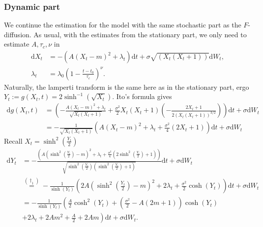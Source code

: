 \subsubsection{Dynamic part}
We continue the estimation for the model with the same stochastic part as the $F$-diffusion. As usual, with the estimates from the stationary part, we only need to estimate $A, \tau_c, \nu$ in
\begin{align}
    \mathrm{d}X_t &= -\left(A(X_t - m)^2 + \lambda_t\right)\mathrm{d}t + \sigma \sqrt{\left(X_t\left(X_t + 1\right)\right)}\mathrm{d}W_t,\\
    \lambda_t &= \lambda_0 \left(1 - \frac{t - t_0}{\tau_c}\right)^\nu.
\end{align}
Naturally, the lamperti transform is the same here as in the stationary part, ergo $Y_t := g(X_t, t) = 2\sinh^{-1}\left(\sqrt{X_t}\right)$. Ito's formula gives 
\begin{align}
    \mathrm{d}g(X_t, t) &= \left(-\frac{A\left(X_t - m\right)^2 + \lambda_t}{\sqrt{X_t\left(X_t + 1\right)}}+ \frac{\sigma^2}{2}X_t\left(X_t + 1\right)\left(-\frac{2X_t + 1}{2\left(X_t\left(X_t + 1\right)\right)^{3/2}}\right)\right)\mathrm{d}t + \sigma\mathrm{d}W_t \nonumber \\
    &= -\frac{1}{\sqrt{X_t\left(X_t + 1\right)}}\left(A\left(X_t - m\right)^2 + \lambda_t + \frac{\sigma^2}{4}\left(2X_t + 1\right)\right)\mathrm{d}t + \sigma\mathrm{d}W_t
\end{align}
Recall $X_t = \sinh^2\left(\frac{Y_t}{2}\right)$
\begin{align}
    \mathrm{d}Y_t &= -\frac{\left(A\left(\sinh^2\left(\frac{Y_t}{2}\right) - m\right)^2 + \lambda_t + \frac{\sigma^2}{4}\left(2\sinh^2\left(\frac{Y_t}{2}\right) + 1\right)\right)}{\sqrt{\sinh^2\left(\frac{Y_t}{2}\right)\left(\sinh^2\left(\frac{Y_t}{2}\right) + 1\right)}}\mathrm{d}t + \sigma\mathrm{d}W_t 
    \nonumber\\ 
    &\overset{(\dagger_1)}{=} - \frac{1}{\sinh\left(Y_t\right)}\left(2A\left(\sinh^2\left(\frac{Y_t}{2}\right) - m\right)^2 + 2\lambda_t + \frac{\sigma^2}{2}\cosh(Y_t)\right)\mathrm{d}t + \sigma\mathrm{d}W_t \nonumber\\
    &=- \frac{1}{\sinh\left(Y_t\right)}\left(\frac{A}{2}\cosh^2\left(Y_t\right) + \left(\frac{\sigma^2}{2} - A \left(2m + 1\right)\right)\cosh\left(Y_t\right)\right. \nonumber \\ 
    &+\left. 2\lambda_t + 2Am^2 + \frac{A}{2} + 2Am\right)\mathrm{d}t + \sigma \mathrm{d}W_t. \label{eq:dynamicScaledFLamperti}
\end{align}
